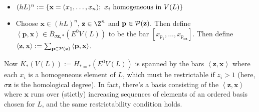 \documentclass[11pt]{article}
\begin{document}
\begin{PRlieKoszulComplexCalculation}
\begin{itemize}
\setlength{\parindent}{.25in}
\item $(hL)^n:=\{\textbf{x}=(x_1,\ldots,x_n);\ x_i\textup{ homogeneous in }V(L)\}$
\item Choose $\textbf{x}\in(hL)^n$, $\textbf{z}\in\Z^n$ and $\textbf{p}\in\mathcal{P}(\textbf{z}).$ Then define $\left\langle \textbf{p},\textbf{x}\right\rangle\in\overline{B}_{\sigma\textbf{z},*}(E^0V(L))$ to be the bar $[x_{p_1},\ldots,x_{p_{\sigma\textbf{z}}}]$. Then define $\left\langle \textbf{z},\textbf{x}\right\rangle:=\sum_{\textbf{p}\in\mathcal{P}(\textbf{z})}\left\langle \textbf{p},\textbf{x}\right\rangle$. 
\end{itemize}
Now $\overline{K}_*(V(L)):=H_{*=*}(E^0V(L))$ is spanned by the bars $\left\langle \textbf{z},\textbf{x}\right\rangle$ where each $x_i$ is a homogeneous element of $L$, which must be restrictable if $z_i>1$ (here, $\sigma\textbf{z}$ is the homological degree). In fact, there's a basis consisting of the $\left\langle \textbf{z},\textbf{x}\right\rangle$ where $\textbf{x}$ runs over (stictly) increasing sequences of elements of an ordered basis chosen for $L$, and the same restrictability condition holds.


\end{PRlieKoszulComplexCalculation}
\end{document}
